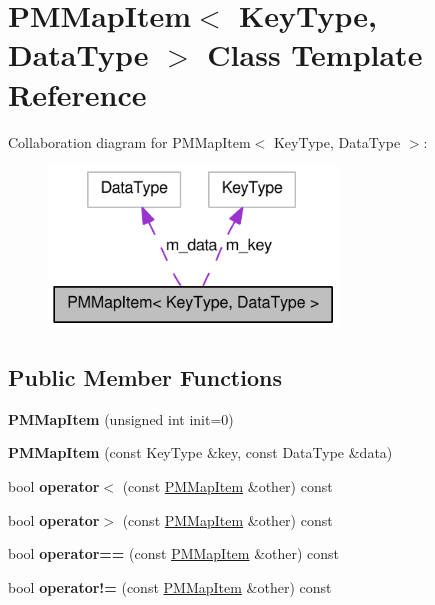 \hypertarget{class_p_m_map_item}{
\section{PMMapItem$<$ KeyType, DataType $>$ Class Template Reference}
\label{class_p_m_map_item}
}


Collaboration diagram for PMMapItem$<$ KeyType, DataType $>$:\nopagebreak
\begin{figure}[H]
\begin{center}
\leavevmode
\includegraphics[width=218pt]{class_p_m_map_item__coll__graph}
\end{center}
\end{figure}
\subsection*{Public Member Functions}
\begin{DoxyCompactItemize}
\item 
\hypertarget{class_p_m_map_item_a75c2839a675a3a0266fc548ed0a31518}{
{\bfseries PMMapItem} (unsigned int init=0)}
\label{class_p_m_map_item_a75c2839a675a3a0266fc548ed0a31518}

\item 
\hypertarget{class_p_m_map_item_a3e74aebd7eb7864345a3ad1c8d86d371}{
{\bfseries PMMapItem} (const KeyType \&key, const DataType \&data)}
\label{class_p_m_map_item_a3e74aebd7eb7864345a3ad1c8d86d371}

\item 
\hypertarget{class_p_m_map_item_a9f9ad2b68a4d1e888b2c7b2e219a0425}{
bool {\bfseries operator$<$} (const \hyperlink{class_p_m_map_item}{PMMapItem} \&other) const }
\label{class_p_m_map_item_a9f9ad2b68a4d1e888b2c7b2e219a0425}

\item 
\hypertarget{class_p_m_map_item_a27e47df26a5ad6809ed1df12477b2105}{
bool {\bfseries operator$>$} (const \hyperlink{class_p_m_map_item}{PMMapItem} \&other) const }
\label{class_p_m_map_item_a27e47df26a5ad6809ed1df12477b2105}

\item 
\hypertarget{class_p_m_map_item_a4ccc167e7ce4cdd1f8ffa406dae23663}{
bool {\bfseries operator==} (const \hyperlink{class_p_m_map_item}{PMMapItem} \&other) const }
\label{class_p_m_map_item_a4ccc167e7ce4cdd1f8ffa406dae23663}

\item 
\hypertarget{class_p_m_map_item_af3d26a4db2b019e1f3fcd9c7f3ddc065}{
bool {\bfseries operator!=} (const \hyperlink{class_p_m_map_item}{PMMapItem} \&other) const }
\label{class_p_m_map_item_af3d26a4db2b019e1f3fcd9c7f3ddc065}

\end{DoxyCompactItemize}
